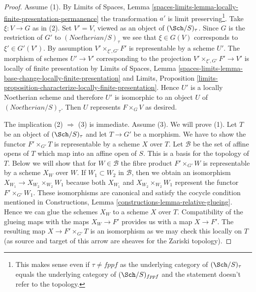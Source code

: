 \begin{proof}
Assume (1). By Limits of Spaces, Lemma
\ref{spaces-limits-lemma-locally-finite-presentation-permanence}
the transformation $a'$ is limit preserving\footnote{This
makes sense even if $\tau \not = fppf$ as the underlying
category of $(\Sch/S)_\tau$ equals the underlying category
of $(\Sch/S)_{fppf}$ and the statement doesn't refer to the topology.}.
Take $\xi : V \to G$ as in (2). Set $V' = V$, viewed as an
object of $(\Sch/S)_\tau$. Since $G$ is the restriction of
$G'$ to $(\textit{Noetherian}/S)_\tau$ we see that
$\xi \in G(V)$ corresponds to $\xi' \in G'(V')$.
By assumption $V' \times_{\xi', G'} F'$ is representable
by a scheme $U'$. The morphism of schemes $U' \to V'$ corresponding to
the projection $V' \times_{\xi', G'} F' \to V'$ is locally of finite
presentation by
Limits of Spaces, Lemma
\ref{spaces-limits-lemma-base-change-locally-finite-presentation} and
Limits, Proposition
\ref{limits-proposition-characterize-locally-finite-presentation}.
Hence $U'$ is a locally Noetherian scheme and therefore $U'$ is
isomorphic to an object $U$ of $(\textit{Noetherian}/S)_\tau$.
Then $U$ represents $F \times_G V$ as desired.

\medskip\noindent
The implication (2) $\Rightarrow$ (3) is immediate. Assume (3).
We will prove (1). Let $T$ be an object of $(\Sch/S)_\tau$
and let $T \to G'$ be a morphism. We have to show
the functor $F' \times_{G'} T$ is representable by a scheme $X$
over $T$. Let $\mathcal{B}$ be the set of affine opens of
$T$ which map into an affine open of $S$. This is a basis
for the topology of $T$. Below we will show that for $W \in \mathcal{B}$
the fibre product $F' \times_{G'} W$ is representable
by a scheme $X_W$ over $W$. If $W_1 \subset W_2$ in $\mathcal{B}$, then
we obtain an isomorphism $X_{W_1} \to X_{W_2} \times_{W_2} W_1$ because both
$X_{W_1}$ and $X_{W_2} \times_{W_2} W_1$ represent the functor
$F' \times_{G'} W_1$.
These isomorphisms are canonical and satisfy the cocycle condition
mentioned in Constructions, Lemma
\ref{constructions-lemma-relative-glueing}.
Hence we can glue the schemes $X_W$ to a scheme $X$ over $T$.
Compatibility of the glueing maps with the maps
$X_W \to F'$ provides us with a map $X \to F'$.
The resulting map $X \to F' \times_{G'} T$ is an
isomorphism as we may check this locally on $T$ (as source
and target of this arrow are sheaves for the Zariski topology).


\end{proof}
